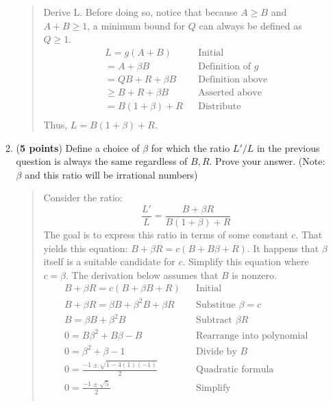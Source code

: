 \documentclass[11pt]{article}
\begin{document}
\begin{enumerate}[leftmargin=*]
\begin{enumerate}
\begin{quote}
        \medskip
        Derive L. Before doing so, notice that because $A \geq B$ and $A + B \geq 1$, a minimum bound for $Q$ can always be defined as $Q \geq 1$.
        \begin{align*}
            && L = g(A + B) && \text{Initial} && \\
            && = A + \beta B && \text{Definition of $g$} && \\
            && = QB + R + \beta B && \text{Definition above} && \\
            && \geq B + R + \beta B && \text{Asserted above} && \\
            && = B(1 + \beta) + R && \text{Distribute} && \\
        \end{align*} 
        Thus, $L = B(1 + \beta) + R$.
      \end{quote}

    \item (\textbf{5 points}) Define a choice of $\beta$ for which the ratio $L'/L$ in the previous question is always the same regardless of $B,R$. Prove your answer. (Note: $\beta$ and this ratio will be irrational numbers)
      \begin{quote}
        \color{purple}
      Consider the ratio:
      $$\frac{L'}{L} = \frac{B + \beta R}{B(1 + \beta) + R}$$
      The goal is to express this ratio in terms of some constant $c$. That yields this equation: $B + \beta R = c(B + B \beta + R)$. It happens that $\beta$ itself is a suitable candidate for $c$. Simplify this equation where $c = \beta$. The derivation below assumes that $B$ is nonzero. 
      \begin{align*}
          && B + \beta R = c(B + \beta B + R) && \text{Initial} && \\
          && B + \beta R = \beta B + \beta^2 B + \beta R && \text{Substitue $\beta = c$} && \\
          && B = \beta B + \beta^2 B && \text{Subtract $\beta R$} && \\
          && 0 = B \beta^2 + B \beta - B && \text{Rearrange into polynomial} && \\
          && 0 = \beta^2 + \beta - 1 && \text{Divide by $B$} && \\
          && 0 = \frac{-1 \pm \sqrt{1 - 4(1)(-1)}}{2} && \text{Quadratic formula} && \\
          && 0 = \frac{-1 \pm \sqrt{5}}{2} && \text{Simplify} && \\
      \end{align*} 


\end{quote}
\end{enumerate}
\end{enumerate}
\end{document}
